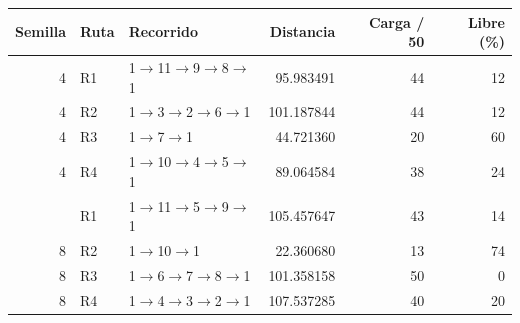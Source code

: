 \begin{tabular}{rllrrr}\toprule
Semilla & Ruta & Recorrido & Distancia & Carga / 50 & Libre (\%)\\\midrule
4 & R1 & 1$\to$11$\to$9$\to$8$\to$1 & 95.983491 & 44 & 12\\
4 & R2 & 1$\to$3$\to$2$\to$6$\to$1 & 101.187844 & 44 & 12\\
4 & R3 & 1$\to$7$\to$1 & 44.721360 & 20 & 60\\
4 & R4 & 1$\to$10$\to$4$\to$5$\to$1 & 89.064584 & 38 & 24\\
\addlinespace
8 & R1 & 1$\to$11$\to$5$\to$9$\to$1 & 105.457647 & 43 & 14\\
8 & R2 & 1$\to$10$\to$1 & 22.360680 & 13 & 74\\
8 & R3 & 1$\to$6$\to$7$\to$8$\to$1 & 101.358158 & 50 & 0\\
8 & R4 & 1$\to$4$\to$3$\to$2$\to$1 & 107.537285 & 40 & 20\\
\bottomrule\end{tabular}
